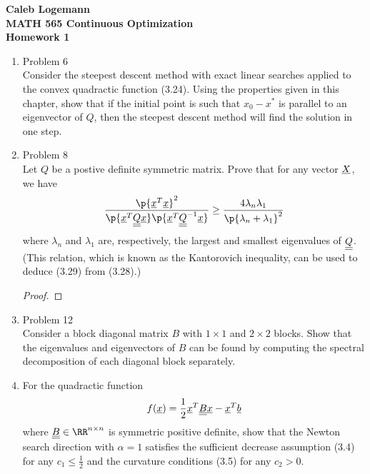 \documentclass[11pt, oneside]{article}
\begin{document}
\noindent \textbf{\Large{Caleb Logemann \\
MATH 565 Continuous Optimization \\
Homework 1
}}

%
\begin{enumerate}
  \item %
    Problem 6 \\
    Consider the steepest descent method with exact linear searches applied to
    the convex quadractic function (3.24).
    Using the properties given in this chapter, show that if the initial point
    is such that $x_0 - x^*$ is parallel to an eigenvector of $Q$, then the
    steepest descent method will find the solution in one step.

  \item %
    Problem 8 \\
    Let $Q$ be a postive definite symmetric matrix.
    Prove that for any vector $\underline{X}$, we have
    \[
      \frac{\p{\v{x}^T\v{x}}^2}{\p{\v{x}^T \M{Q} \v{x}}\p{\v{x}^T \M{Q}^{-1} \v{x}}}
      \ge \frac{4\lambda_n \lambda_1}{\p{\lambda_n + \lambda_1}^2}
    \]
    where $\lambda_n$ and $\lambda_1$ are, respectively, the largest and
    smallest eigenvalues of $\underline{\underline{Q}}$.
    (This relation, which is known as the Kantorovich inequality, can be used to
    deduce (3.29) from (3.28).)

    \begin{proof}
      
    \end{proof}

  \item %
    Problem 12 \\
    Consider a block diagonal matrix $B$ with $1 \times 1$ and $2 \times 2$
    blocks.
    Show that the eigenvalues and eigenvectors of $B$ can be found by computing
    the spectral decomposition of each diagonal block separately.

  \item %
    For the quadractic function
    \[
      f(\underline{x}) = \frac{1}{2} \underline{x}^T \underline{\underline{B}} \underline{x} - \underline{x}^T \underline{b}
    \]
    where $\M{B} \in \RR^{n \times n}$ is symmetric positive definite, show that the
    Newton search direction with $\alpha = 1$ satisfies the sufficient
    decrease assumption (3.4) for any $c_1 \le \frac{1}{2}$ and the curvature
    conditions (3.5) for any $c_2 > 0$.


\end{enumerate}
\end{document}
